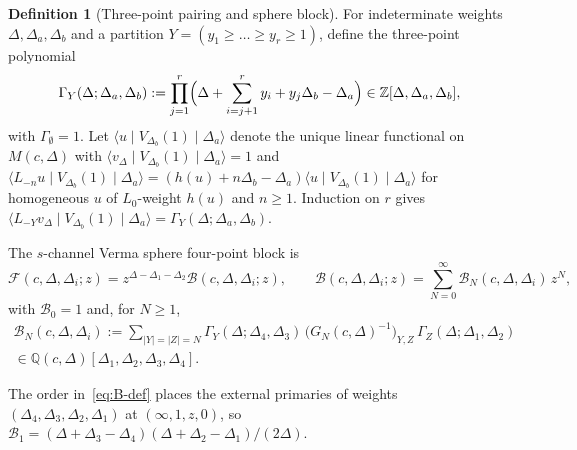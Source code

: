 \documentclass[twoside,10pt]{article}
\numberwithin{equation}{section}
\theoremstyle{slbody}
\theoremstyle{definition}
\newtheorem{definition}[theorem]{Definition}
\theoremstyle{remark}
\begin{document}
\begin{definition}[Three-point pairing and sphere block]\label{def:sphere-block}
For indeterminate weights \(\Delta,\Delta_a,\Delta_b\) and a partition
\(Y=(y_1\geq\dots\geq y_r\geq1)\), define the three-point polynomial
\begin{equation}\label{eq:gamma-Y}
 \Gamma_Y(\Delta;\Delta_a,\Delta_b)
 :=\prod_{j=1}^r\Bigl(\Delta+\sum_{i=j+1}^r y_i+y_j\Delta_b-\Delta_a\Bigr)
 \in\mathbb Z[\Delta,\Delta_a,\Delta_b],
\end{equation}
with \(\Gamma_\emptyset=1\).  Let \(\langle u\mid V_{\Delta_b}(1)\mid\Delta_a\rangle\)
denote the unique linear functional on \(M(c,\Delta)\) with
\(\langle v_\Delta\mid V_{\Delta_b}(1)\mid\Delta_a\rangle=1\) and
\(\langle L_{-n}u\mid V_{\Delta_b}(1)\mid\Delta_a\rangle
=(h(u)+n\Delta_b-\Delta_a)\langle u\mid V_{\Delta_b}(1)\mid\Delta_a\rangle\) for
homogeneous \(u\) of \(L_0\)-weight \(h(u)\) and \(n\geq1\).  Induction on
\(r\) gives \(\langle L_{-Y}v_\Delta\mid V_{\Delta_b}(1)\mid\Delta_a\rangle
=\Gamma_Y(\Delta;\Delta_a,\Delta_b)\).

The \(s\)-channel Verma sphere four-point block is
\[
 \mathcal F(c,\Delta,\Delta_i;z)
 =z^{\Delta-\Delta_1-\Delta_2}\mathcal B(c,\Delta,\Delta_i;z),
 \qquad
 \mathcal B(c,\Delta,\Delta_i;z)
 =\sum_{N=0}^\infty\mathcal B_N(c,\Delta,\Delta_i)\,z^N,
\]
with \(\mathcal B_0=1\) and, for \(N\geq1\),
\begin{multline}\label{eq:B-def}
 \mathcal B_N(c,\Delta,\Delta_i)
 :=\sum_{|Y|=|Z|=N}\Gamma_Y(\Delta;\Delta_4,\Delta_3)\,
   \bigl(G_N(c,\Delta)^{-1}\bigr)_{Y,Z}\,\Gamma_Z(\Delta;\Delta_1,\Delta_2)\\
 \in\mathbb Q(c,\Delta)[\Delta_1,\Delta_2,\Delta_3,\Delta_4].
\end{multline}
\end{definition}

The order in~\eqref{eq:B-def} places the external primaries of weights
\((\Delta_4,\Delta_3,\Delta_2,\Delta_1)\) at \((\infty,1,z,0)\), so \(\mathcal B_1=(\Delta+\Delta_3-\Delta_4)(\Delta+\Delta_2-\Delta_1)/(2\Delta)\).
\end{document}
